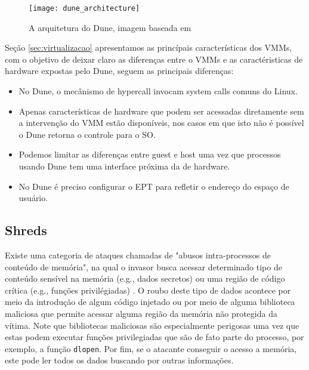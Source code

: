 \begin{figure}[!h]
  \centering
  \texttt{[image: dune\_architecture]} 
  \caption{A arquitetura do Dune, imagem baseada em \citep{belay}}
  \label{fig:resource_constainer_scenarios}
\end{figure}

Seção \ref{sec:virtualizacao} apresentamos as princípais características dos
VMMs, com o objetivo de deixar claro as diferenças entre o VMMs e as
caractéristicas de hardware expostas pelo Dune, seguem as principais
diferenças:


\begin{itemize}
  \item No Dune, o mecânismo de hypercall invocam system calls comuns do Linux.
  \item Apenas características de hardware que podem ser acessadas diretamente sem a intervenção do VMM estão disponíveis, nos casos em que isto não é possível o Dune retorna o controle para o SO.
  \item Podemos limitar as diferenças entre guest e host uma vez que processos usando Dune tem uma interface próxima da de hardware.
  \item No Dune é preciso configurar o EPT para refletir o endereço do espaço de usuário.
\end{itemize}

\subsection{Shreds}

Existe uma categoria de ataques chamadas de "abusos intra-processos de conteúdo
de memória", na qual o invasor busca acessar determinado tipo de conteúdo
sensível na memória (e.g., dados secretos) ou uma região de código crítica
(e.g., funções privilégiadas) \cite{shreds}. O roubo deste tipo de dados
acontece por meio da introdução de algum código injetado ou por meio de alguma
biblioteca maliciosa que permite acessar alguma região da memória não protegida
da vítima. Note que bibliotecas maliciosas são especialmente perigosas uma vez
que estas podem executar funções privilegiadas que são de fato parte do
processo, por exemplo, a função \texttt{dlopen}. Por fim, se o atacante
conseguir o acesso a memória, este pode ler todos os dados buscando por outras
informações.

